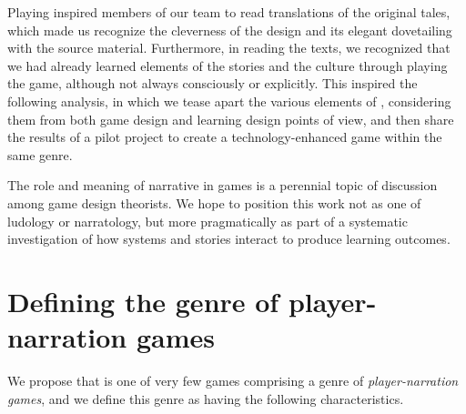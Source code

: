 \documentclass[a4paper]{article}
\begin{document}
Playing \totan{}  inspired members of our team to read translations
of the original tales, which made us recognize the cleverness of the design
and its elegant dovetailing with the source material.
Furthermore, in reading the texts, we recognized that we had already
learned elements of the stories and the culture through playing the game,
although not always consciously or explicitly.
This inspired the following analysis, in which we tease apart the
various elements of \totan{}, considering them from both game design
and learning design points of view, and then share the results of a pilot
project to create a technology-enhanced game within the same genre.

The role and meaning of narrative in games is a perennial topic
of discussion among game design theorists.
We hope to position this work not as one of ludology or narratology,
but more pragmatically as part of a systematic investigation of how
systems and stories interact to produce learning outcomes.

\section{Defining the genre of player-narration games}

We propose that \totan{} is one of very few games comprising a genre
of \textit{player-narration games}, and we define this genre as having
the following characteristics.
\end{document}
